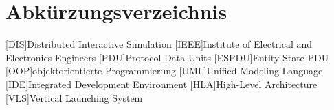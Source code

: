 


\newpage
\chapter*{Abkürzungsverzeichnis}
%
\begin{acronym}[XXXXXX]
	\setlength{\itemsep}{-\parsep}
	[DIS]{Distributed Interactive Simulation}
	[IEEE]{Institute of Electrical and Electronics Engineers}
	[PDU]{Protocol Data Units}
	[ESPDU]{Entity State PDU}
	[OOP]{objektorientierte Programmierung }
	[UML]{Unified Modeling Language}
	[IDE]{Integrated Development Environment}
	[HLA]{High-Level Architecture}
	[VLS]{Vertical Launching System }
	
\end{acronym}
\newpage